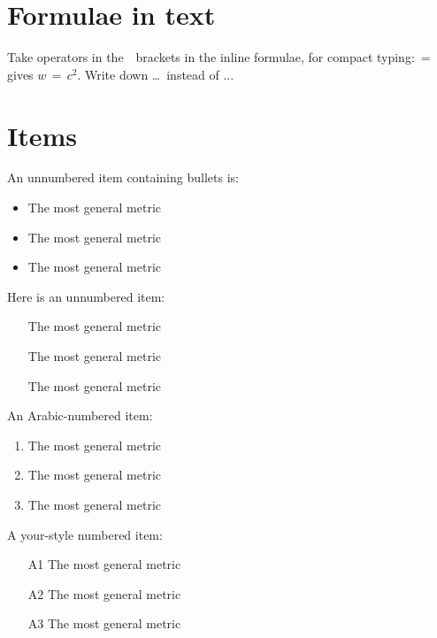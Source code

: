 \documentclass[twoside,final]{article}
\begin{document}
{%



\section{Formulae in text}

Take operators in the \,{}\, brackets in the inline formulae, for compact
typing: \,{=}\, gives $w \,{=}\, c^2 $. Write down \dots \ instead of ...


\section{Items}


An unnumbered item containing bullets is:
\begin{itemize}
\item The most general metric
\item The most general metric
\item The most general metric
\end{itemize}


Here is an unnumbered item:
\begin{itemize}
\item [] The most general metric
\item [] The most general metric
\item [] The most general metric
\end{itemize}


An Arabic-numbered item:
\begin{enumerate}
\item The most general metric
\item The most general metric
\item The most general metric
\end{enumerate}


A your-style numbered item:
\begin{itemize}
\item [A1] The most general metric
\item [A2] The most general metric
\item [A3] The most general metric
\end{itemize}


}
\end{document}
